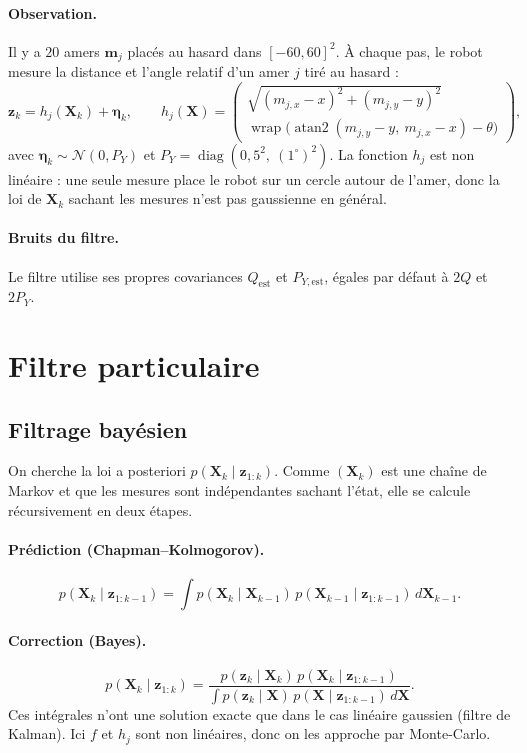 \documentclass[11pt]{article}
\theoremstyle{definition}
\theoremstyle{remark}
\newcommand{\N}{\mathcal{N}}
\newcommand{\X}{\mathbf{X}}
\newcommand{\z}{\mathbf{z}}
\newcommand{\wrap}{\operatorname{wrap}}
\newcommand{\diag}{\operatorname{diag}}
\begin{document}
\paragraph{Observation.} Il y a $20$ amers $\mathbf{m}_j$ placés au hasard dans
$[-60, 60]^2$. À chaque pas, le robot mesure la distance et l'angle relatif
d'un amer $j$ tiré au hasard :
\begin{equation}
  \z_k = h_j(\X_k) + \bm\eta_k, \qquad
  h_j(\X) =
  \begin{pmatrix}
    \sqrt{(m_{j,x} - x)^2 + (m_{j,y} - y)^2}\\
    \wrap\big(\operatorname{atan2}(m_{j,y} - y,\ m_{j,x} - x) - \theta\big)
  \end{pmatrix},
  \label{eq-h}
\end{equation}
avec $\bm\eta_k \sim \N(0, P_Y)$ et $P_Y = \diag(0{,}5^2,\ (1^\circ)^2)$. La fonction
$h_j$ est non linéaire : une seule mesure place le robot sur un cercle autour
de l'amer, donc la loi de $\X_k$ sachant les mesures n'est pas gaussienne en
général.

\paragraph{Bruits du filtre.} Le filtre utilise ses propres covariances
$Q_{\mathrm{est}}$ et $P_{Y,\mathrm{est}}$, égales par défaut à $2Q$ et $2P_Y$.

\section{Filtre particulaire}

\subsection{Filtrage bayésien}
On cherche la loi a posteriori $p(\X_k \mid \z_{1:k})$. Comme $(\X_k)$ est une
chaîne de Markov et que les mesures sont indépendantes sachant l'état, elle se
calcule récursivement en deux étapes.

\paragraph{Prédiction (Chapman--Kolmogorov).}
\begin{equation}
  p(\X_k \mid \z_{1:k-1}) = \int p(\X_k \mid \X_{k-1})\, p(\X_{k-1} \mid \z_{1:k-1})\, d\X_{k-1}.
  \label{eq-ck}
\end{equation}

\paragraph{Correction (Bayes).}
\begin{equation}
  p(\X_k \mid \z_{1:k}) =
  \frac{p(\z_k \mid \X_k)\, p(\X_k \mid \z_{1:k-1})}{\int p(\z_k \mid \X)\, p(\X \mid \z_{1:k-1})\, d\X}.
  \label{eq-bayes}
\end{equation}
Ces intégrales n'ont une solution exacte que dans le cas linéaire gaussien
(filtre de Kalman). Ici $f$ et $h_j$ sont non linéaires, donc on les approche
par Monte-Carlo.
\end{document}

